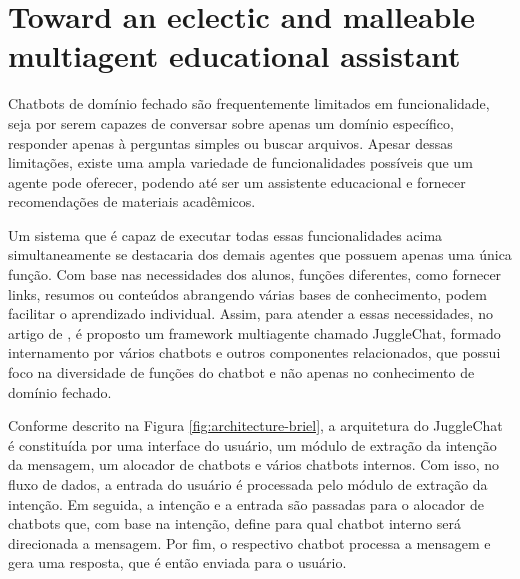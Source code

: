 \section{Toward an eclectic and malleable multiagent educational assistant \cite{briel2021}}
\label{sec:briel2021}


Chatbots de domínio fechado são frequentemente limitados em funcionalidade, seja por serem capazes de conversar sobre apenas um domínio específico, responder apenas à perguntas simples ou buscar arquivos. Apesar dessas limitações, existe uma ampla variedade de funcionalidades possíveis que um agente pode oferecer, podendo até ser um assistente educacional e fornecer recomendações de materiais acadêmicos.

Um sistema que é capaz de executar todas essas funcionalidades acima simultaneamente se destacaria dos demais agentes que possuem apenas uma única função. Com base nas necessidades dos alunos, funções diferentes, como fornecer links, resumos ou conteúdos abrangendo várias bases de conhecimento, podem facilitar o aprendizado individual. Assim, para atender a essas necessidades, no artigo de , é proposto um framework multiagente chamado JuggleChat, formado internamento por vários chatbots e outros componentes relacionados, que possui foco na diversidade de funções do chatbot e não apenas no conhecimento de domínio fechado.

Conforme descrito na Figura \ref{fig:architecture-briel}, a arquitetura do JuggleChat é constituída por uma interface do usuário, um módulo de extração da intenção da mensagem, um alocador de chatbots e vários chatbots internos. Com isso, no fluxo de dados, a entrada do usuário é processada pelo módulo de extração da intenção. Em seguida, a intenção e a entrada são passadas para o alocador de chatbots que, com base na intenção, define para qual chatbot interno será direcionada a mensagem. Por fim, o respectivo chatbot processa a mensagem e gera uma resposta, que é então enviada para o usuário.

